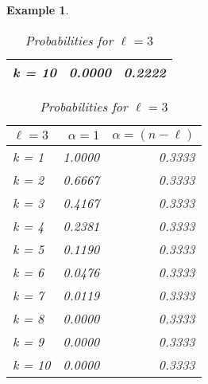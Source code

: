 \documentclass{article}
\newtheorem{example}{Example} %
\begin{document}
\begin{example}
\begin{table}[H]
\begin{minipage}{0.33\textwidth}
\begin{tabular}{lrr}
k = 10 &     0.0000 &         0.2222 \\
\hline
\end{tabular}
\caption{Probabilities for $\ell=2$}
\end{minipage}\hfill
\centering
\begin{minipage}{0.33\textwidth}
\small
\begin{tabular}{lrr}
\hline
$\ell=3$ & $\alpha = 1$ & $\alpha = (n-\ell)$ \\
\hline
k = 1  &     1.0000 &         0.3333 \\
k = 2  &     0.6667 &         0.3333 \\
k = 3  &     0.4167 &         0.3333 \\
k = 4  &     0.2381 &         0.3333 \\
k = 5  &     0.1190 &         0.3333 \\
k = 6  &     0.0476 &         0.3333 \\
k = 7  &     0.0119 &         0.3333 \\
k = 8  &     0.0000 &         0.3333 \\
k = 9  &     0.0000 &         0.3333 \\
k = 10 &     0.0000 &         0.3333 \\
\hline
\end{tabular}
\caption{Probabilities for $\ell=3$}
\end{minipage}\hfill
\end{table}

\begin{table}[H]
\centering
\begin{minipage}{0.33\textwidth}


\end{minipage}
\end{table}
\end{example}
\end{document}
